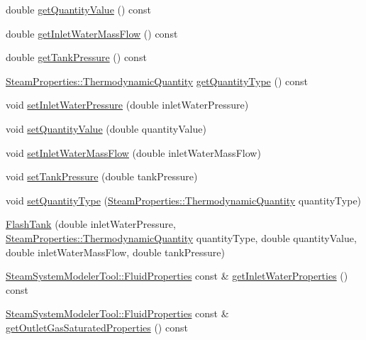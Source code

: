 \begin{DoxyCompactItemize}
\item 
double \hyperlink{class_flash_tank_ab2145598969881df58736a1b65326d17}{get\+Quantity\+Value} () const
\item 
double \hyperlink{class_flash_tank_a2b6dcd9e175a9f2fc550ea91006aa66a}{get\+Inlet\+Water\+Mass\+Flow} () const
\item 
double \hyperlink{class_flash_tank_af5d4f0bf7babe61120e1e4452594e1af}{get\+Tank\+Pressure} () const
\item 
\hyperlink{class_steam_properties_ae0294bedf7d178c2d8fb6aed0f62fbff}{Steam\+Properties\+::\+Thermodynamic\+Quantity} \hyperlink{class_flash_tank_a1800317a9b9dd8ff8fb18c693e846a45}{get\+Quantity\+Type} () const
\item 
void \hyperlink{class_flash_tank_aed0991a7902401d110fb2f4b472326f5}{set\+Inlet\+Water\+Pressure} (double inlet\+Water\+Pressure)
\item 
void \hyperlink{class_flash_tank_ac7392743aeaf8de6ce368814ea42e236}{set\+Quantity\+Value} (double quantity\+Value)
\item 
void \hyperlink{class_flash_tank_a2bcbd92d39ef3c760bdd65066ba3d34a}{set\+Inlet\+Water\+Mass\+Flow} (double inlet\+Water\+Mass\+Flow)
\item 
void \hyperlink{class_flash_tank_a8b3bb51a62dac4f76284dfdc114d83fe}{set\+Tank\+Pressure} (double tank\+Pressure)
\item 
void \hyperlink{class_flash_tank_a30aa7a42d1547f61b176da4a15e8e8ee}{set\+Quantity\+Type} (\hyperlink{class_steam_properties_ae0294bedf7d178c2d8fb6aed0f62fbff}{Steam\+Properties\+::\+Thermodynamic\+Quantity} quantity\+Type)
\item 
\hyperlink{class_flash_tank_ad576e26508da35738127a65fd6ddc35d}{Flash\+Tank} (double inlet\+Water\+Pressure, \hyperlink{class_steam_properties_ae0294bedf7d178c2d8fb6aed0f62fbff}{Steam\+Properties\+::\+Thermodynamic\+Quantity} quantity\+Type, double quantity\+Value, double inlet\+Water\+Mass\+Flow, double tank\+Pressure)
\item 
\hyperlink{struct_steam_system_modeler_tool_1_1_fluid_properties}{Steam\+System\+Modeler\+Tool\+::\+Fluid\+Properties} const  \& \hyperlink{class_flash_tank_a582b3e730f1619891533965940d692de}{get\+Inlet\+Water\+Properties} () const
\item 
\hyperlink{struct_steam_system_modeler_tool_1_1_fluid_properties}{Steam\+System\+Modeler\+Tool\+::\+Fluid\+Properties} const  \& \hyperlink{class_flash_tank_a9db00130ed4419e2e251c9e5ce936572}{get\+Outlet\+Gas\+Saturated\+Properties} () const
\item 

\end{DoxyCompactItemize}
